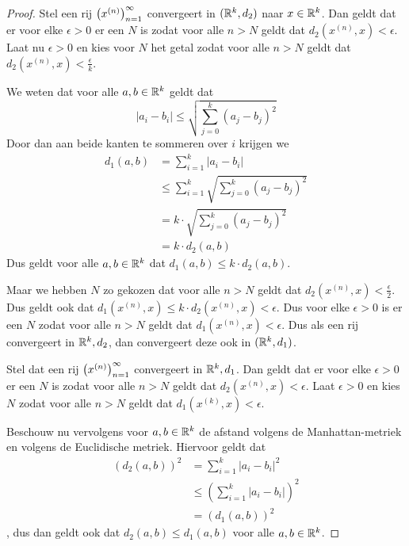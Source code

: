 \label{sec:eqeucman}
\begin{proof}
    Stel een rij \(\left(x^{(n)}\right)_{n=1}^{\infty}\) convergeert in \((\mathbb{R}^{k},d_{2})\) naar \(x\in\mathbb{R}^{k}\). Dan geldt dat er voor elke \(\epsilon>0\) er een \(N\) is zodat voor alle \(n>N\) geldt dat \(d_{2}(x^{(n)},x)<\epsilon\). Laat nu \(\epsilon>0\) en kies voor \(N\) het getal zodat voor alle \(n>N\) geldt dat \(d_{2}\left(x^{(n)},x\right)<\frac{\epsilon}{k}\).

    We weten dat voor alle \(a,b\in\mathbb{R}^{k}\) geldt dat 
    \[
        \left|a_{i}-b_{i}\right|\leq\sqrt{\sum\limits_{j=0}^{k}(a_{j}-b_{j})^{2}}
    \]
    Door dan aan beide kanten te sommeren over \(i\) krijgen we
    \begin{align*}
        d_{1}(a,b)&= \sum\limits_{i=1}^{k}\left|a_{i}-b_{i}\right|\\
        &\leq \sum\limits_{i=1}^{k}\sqrt{\sum\limits_{j=0}^{k}(a_{j}-b_{j})^{2}}\\
        &=k\cdot\sqrt{\sum\limits_{j=0}^{k}(a_{j}-b_{j})^{2}}\\
        &=k\cdot d_{2}(a,b)
    \end{align*}
    Dus geldt voor alle \(a,b\in\mathbb{R}^{k}\) dat \(d_{1}(a,b)\leq k\cdot d_{2}(a,b)\).

    Maar we hebben \(N\) zo gekozen dat voor alle \(n>N\) geldt dat \(d_{2}(x^{(n)},x)<\frac{\epsilon}{2}\). Dus geldt ook dat \(d_{1}(x^{(n)},x)\leq k\cdot d_{2}(x^{(n)},x)<\epsilon\). Dus voor elke \(\epsilon>0\) is er een \(N\) zodat voor alle \(n>N\) geldt dat \(d_{1}(x^{(n)},x)<\epsilon\). Dus als een rij convergeert in \(\mathbb{R}^{k}, d_{2}\), dan convergeert deze ook in \((\mathbb{R}^{k},d_{1})\).

    Stel dat een rij \(\left(x^{(n)}\right)_{n=1}^{\infty}\) convergeert in \(\mathbb{R}^{k},d_{1}\). Dan geldt dat er voor elke \(\epsilon>0\) er een \(N\) is zodat voor alle \(n>N\) geldt dat \(d_{2}(x^{(n)},x)<\epsilon\). Laat \(\epsilon>0\) en kies \(N\) zodat voor alle \(n>N\) geldt dat \(d_{1}(x^{(k)},x)<\epsilon\).

    Beschouw nu vervolgens voor \(a,b\in\mathbb{R}^{k}\) de afstand volgens de Manhattan-metriek en volgens de Euclidische metriek. Hiervoor geldt dat
    \begin{align*}
        \left(d_{2}(a,b)\right)^{2}& =\sum\limits_{i=1}^{k}\left|a_{i}-b_{i}\right|^{2}\\
        &\leq \left(\sum\limits_{i=1}^{k}\left|a_{i}-b_{i}\right|\right)^{2}\\
        &= \left(d_{1}(a,b)\right)^{2}
    \end{align*}
    , dus dan geldt ook dat \(d_{2}(a,b)\leq d_{1}(a,b)\) voor alle \(a,b\in\mathbb{R}^{k}\).


\end{proof}
